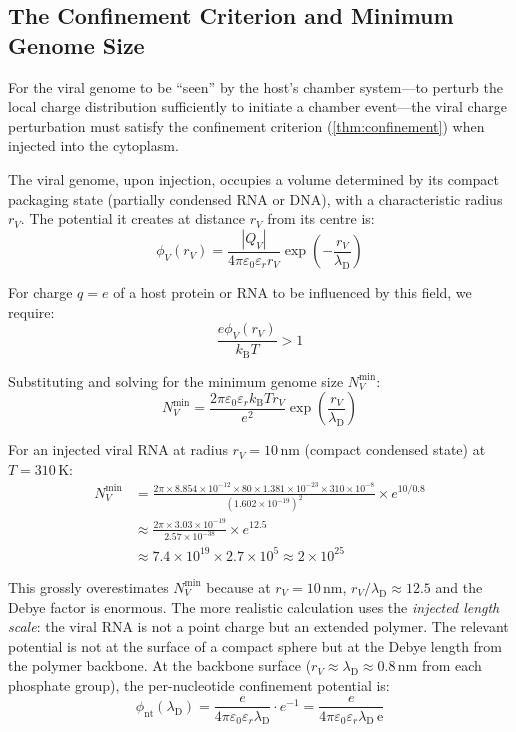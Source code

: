 \documentclass[12pt,a4paper]{article}
\theoremstyle{definition}
\theoremstyle{remark}
\newcommand{\kB}{k_{\mathrm{B}}}
\newcommand{\lD}{\lambda_{\mathrm{D}}}
\newcommand{\eps}{\varepsilon}
\newcommand{\epsz}{\varepsilon_{0}}
\newcommand{\abs}[1]{\left|#1\right|}
\begin{document}
\subsection{The Confinement Criterion and Minimum Genome Size}

For the viral genome to be ``seen'' by the host's chamber system---to perturb the local charge distribution sufficiently to initiate a chamber event---the viral charge perturbation must satisfy the confinement criterion (\cref{thm:confinement}) when injected into the cytoplasm.

The viral genome, upon injection, occupies a volume determined by its compact packaging state (partially condensed RNA or DNA), with a characteristic radius $r_V$. The potential it creates at distance $r_V$ from its centre is:
\begin{equation}
  \phi_V(r_V) = \frac{\abs{Q_V}}{4\pi \epsz \eps_r r_V} \exp\!\left(-\frac{r_V}{\lD}\right)
\end{equation}

For charge $q = e$ of a host protein or RNA to be influenced by this field, we require:
\begin{equation}
  \frac{e \phi_V(r_V)}{\kB T} > 1
\end{equation}

Substituting and solving for the minimum genome size $N_V^{\min}$:
\begin{equation}
  N_V^{\min} = \frac{2\pi \epsz \eps_r \kB T r_V}{e^2} \exp\!\left(\frac{r_V}{\lD}\right)
  \label{eq:Nmin}
\end{equation}

For an injected viral RNA at radius $r_V = 10$\,nm (compact condensed state) at $T = 310$\,K:
\begin{align}
  N_V^{\min} &= \frac{2\pi \times 8.854 \times 10^{-12} \times 80 \times 1.381 \times 10^{-23} \times 310 \times 10^{-8}}{(1.602 \times 10^{-19})^2} \times e^{10/0.8} \\
  &\approx \frac{2\pi \times 3.03 \times 10^{-19}}{2.57 \times 10^{-38}} \times e^{12.5} \\
  &\approx 7.4 \times 10^{19} \times 2.7 \times 10^5 \approx 2 \times 10^{25}
\end{align}

This grossly overestimates $N_V^{\min}$ because at $r_V = 10$\,nm, $r_V/\lD \approx 12.5$ and the Debye factor is enormous. The more realistic calculation uses the \emph{injected length scale}: the viral RNA is not a point charge but an extended polymer. The relevant potential is not at the surface of a compact sphere but at the Debye length from the polymer backbone. At the backbone surface ($r_V \approx \lD \approx 0.8$\,nm from each phosphate group), the per-nucleotide confinement potential is:
\begin{equation}
  \phi_{\mathrm{nt}}(\lD) = \frac{e}{4\pi \epsz \eps_r \lD} \cdot e^{-1} = \frac{e}{4\pi \epsz \eps_r \lD \, \mathrm{e}}
\end{equation}
\end{document}
